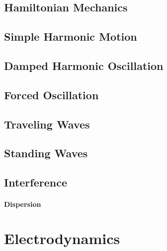 \documentclass[10pt]{report}
\begin{document}
\section{Hamiltonian Mechanics}
\clearpage
\clearpage

\section{Simple Harmonic Motion}
\clearpage

\section{Damped Harmonic Oscillation}
\clearpage

\section{Forced Oscillation}
\clearpage

\section{Traveling Waves}
\clearpage
\clearpage

\section{Standing Waves}
\clearpage

\section{Interference}
\clearpage
\clearpage

\subsubsection{Dispersion}
\clearpage

\chapter{Electrodynamics}
\end{document}

